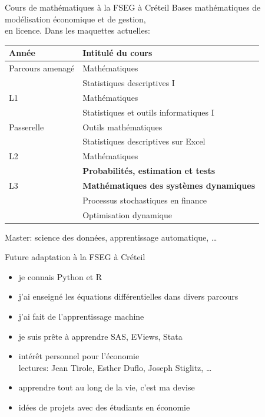 \documentclass[
  french,
  ignorenonframetext,
]{beamer}
\providecommand{\tightlist}{%
  \setlength{\itemsep}{0pt}\setlength{\parskip}{0pt}}
\begin{document}
\begin{frame}{Cours de mathématiques à la FSEG à Créteil}
\protect\hypertarget{cours-de-mathuxe9matiques-uxe0-la-fseg-uxe0-cruxe9teil}{}
Bases mathématiques de modélisation économique et de gestion,\\
en licence. Dans les maquettes actuelles:

\begin{longtable}[]{@{}ll@{}}
\toprule
Année & Intitulé du cours\tabularnewline
\midrule
\endhead
Parcours amenagé & Mathématiques\tabularnewline
& Statistiques descriptives I\tabularnewline
L1 & Mathématiques\tabularnewline
& Statistiques et outils informatiques I\tabularnewline
Passerelle & Outils mathématiques\tabularnewline
& Statistiques descriptives sur Excel\tabularnewline
L2 & Mathématiques\tabularnewline
& \textbf{Probabilités, estimation et tests}\tabularnewline
L3 & \textbf{Mathématiques des systèmes dynamiques}\tabularnewline
& Processus stochastiques en finance\tabularnewline
& Optimisation dynamique\tabularnewline
\bottomrule
\end{longtable}

Master: science des données, apprentissage automatique, \ldots{}
\end{frame}

\begin{frame}{Future adaptation à la FSEG à Créteil}
\protect\hypertarget{future-adaptation-uxe0-la-fseg-uxe0-cruxe9teil}{}
\begin{itemize}
\tightlist
\item
  je connais Python et R
\item
  j'ai enseigné les équations différentielles dans divers parcours
\item
  j'ai fait de l'apprentissage machine
\item
  je suis prête à apprendre SAS, EViews, Stata
\item
  intérêt personnel pour l'économie\\
  lectures: Jean Tirole, Esther Duflo, Joseph Stiglitz, \ldots{}
\item
  apprendre tout au long de la vie, c'est ma devise
\item
  idées de projets avec des étudiants en économie
\end{itemize}
\end{frame}
\end{document}

